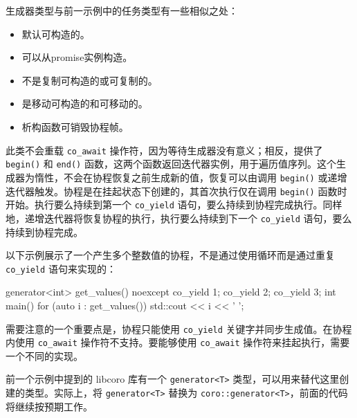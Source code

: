 生成器类型与前一示例中的任务类型有一些相似之处：

\begin{itemize}
\item
默认可构造的。

\item
可以从promise实例构造。

\item
不是复制可构造的或可复制的。

\item
是移动可构造的和可移动的。

\item
析构函数可销毁协程帧。
\end{itemize}

此类不会重载 \verb|co_await| 操作符，因为等待生成器没有意义；相反，提供了 \verb|begin()| 和 \verb|end()| 函数，这两个函数返回迭代器实例，用于遍历值序列。这个生成器为惰性，不会在协程恢复之前生成新的值，恢复可以由调用 \verb|begin()| 或递增迭代器触发。协程是在挂起状态下创建的，其首次执行仅在调用 \verb|begin()| 函数时开始。执行要么持续到第一个 \verb|co_yield| 语句，要么持续到协程完成执行。同样地，递增迭代器将恢复协程的执行，执行要么持续到下一个 \verb|co_yield| 语句，要么持续到协程完成。

以下示例展示了一个产生多个整数值的协程，不是通过使用循环而是通过重复 \verb|co_yield| 语句来实现的：

\begin{cpp}
generator<int> get_values() noexcept
{
    co_yield 1;
    co_yield 2;
    co_yield 3;
}
int main()
{
    for (auto i : get_values())
    {
        std::cout << i << ' ';
    }
}
\end{cpp}

需要注意的一个重要点是，协程只能使用 \verb|co_yield| 关键字并同步生成值。在协程内使用 \verb|co_await| 操作符不支持。要能够使用 \verb|co_await| 操作符来挂起执行，需要一个不同的实现。


前一个示例中提到的 libcoro 库有一个 \verb|generator<T>| 类型，可以用来替代这里创建的类型。实际上，将 \verb|generator<T>| 替换为 \verb|coro::generator<T>|，前面的代码将继续按预期工作。

